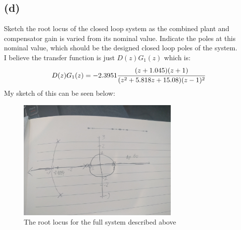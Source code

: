 \documentclass{article}
\begin{document}
\subsection*{(d)}
Sketch the root locus of the closed loop system as the combined plant and compensator gain is varied from its nominal value. Indicate the poles at this nominal value, which should be the designed closed loop poles of the system.\\
I believe the transfer function is just $D(z)G_1(z)$ which is:
\[D(z)G_1(z)=-2.3951\cfrac{(z+1.045)(z+1)}{(z^2+5.818z+15.08)(z-1)^2}\]
My sketch of this can be seen below:
\begin{figure}[H]
    \centering
    \includegraphics[width=0.7\textwidth]{p2rlocus.jpg}
    \caption{The root locus for the full system described above}
\end{figure}
\end{document}
